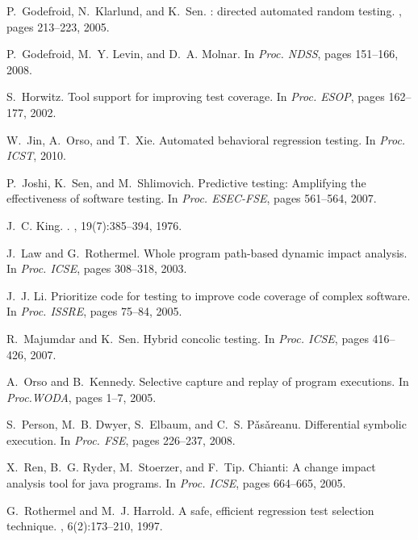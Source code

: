 \documentclass{sig-alternate}
\begin{document}
\begin{thebibliography}{10}
\begin{scriptsize}
P.~Godefroid, N.~Klarlund, and K.~Sen.
: directed automated random testing.
, pages 213--223, 2005.

P.~Godefroid, M.~Y. Levin, and D.~A. Molnar.
\newblock In {\em Proc. NDSS}, pages 151--166, 2008.

S.~Horwitz.
\newblock Tool support for improving test coverage.
\newblock In {\em Proc. ESOP}, pages 162--177, 2002.

W.~Jin, A.~Orso, and T.~Xie.
\newblock Automated behavioral regression testing.
\newblock In {\em Proc. ICST}, 2010.

P.~Joshi, K.~Sen, and M.~Shlimovich.
\newblock Predictive testing: Amplifying the effectiveness of software testing.
\newblock In {\em Proc. ESEC-FSE}, pages 561--564, 2007.

J.~C. King.
.
, 19(7):385--394, 1976.

J.~Law and G.~Rothermel.
\newblock Whole program path-based dynamic impact analysis.
\newblock In {\em Proc. ICSE}, pages 308--318, 2003.

J.~J. Li.
\newblock Prioritize code for testing to improve code coverage of complex
  software.
\newblock In {\em Proc. ISSRE}, pages 75--84, 2005.

R.~Majumdar and K.~Sen.
\newblock Hybrid concolic testing.
\newblock In {\em Proc. ICSE}, pages 416--426, 2007.

A.~Orso and B.~Kennedy.
\newblock Selective capture and replay of program executions.
\newblock In {\em Proc.WODA}, pages 1--7, 2005.

S.~Person, M.~B. Dwyer, S.~Elbaum, and C.~S. P\v{a}s\v{a}reanu.
\newblock Differential symbolic execution.
\newblock In {\em Proc. FSE}, pages 226--237, 2008.

X.~Ren, B.~G. Ryder, M.~Stoerzer, and F.~Tip.
\newblock Chianti: A change impact analysis tool for java programs.
\newblock In {\em Proc. ICSE}, pages 664--665, 2005.

G.~Rothermel and M.~J. Harrold.
\newblock A safe, efficient regression test selection technique.
, 6(2):173--210, 1997.


\end{scriptsize}
\end{thebibliography}
\end{document}
